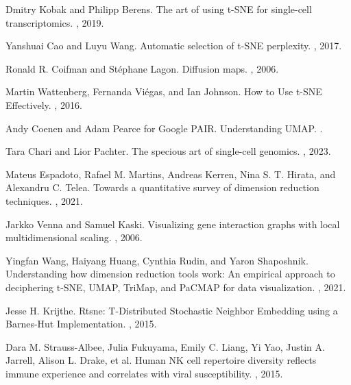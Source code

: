 \documentclass{article}
\begin{document}
\begin{thebibliography}{10}
Dmitry Kobak and Philipp Berens.
\newblock The art of using t-SNE for single-cell transcriptomics.
, 2019.

Yanshuai Cao and Luyu Wang. 
\newblock Automatic selection of t-SNE perplexity.
, 2017.

Ronald R. Coifman and St\'ephane Lagon.
\newblock Diffusion maps.
, 2006.

Martin Wattenberg, Fernanda Vi\'egas, and Ian Johnson.
\newblock How to Use t-SNE Effectively.
, 2016.

Andy Coenen and Adam Pearce for Google PAIR.
\newblock Understanding UMAP.
.

Tara Chari and Lior Pachter.
\newblock The specious art of single-cell genomics.
,  2023.

Mateus Espadoto, Rafael M. Martins, Andreas Kerren, Nina S. T. Hirata, and Alexandru C. Telea.
\newblock Towards a quantitative survey of dimension reduction techniques.
, 2021.

Jarkko Venna and Samuel Kaski.
\newblock Visualizing gene interaction graphs with local multidimensional scaling.
, 2006.

Yingfan Wang, Haiyang Huang, Cynthia Rudin, and Yaron Shaposhnik.
\newblock Understanding how dimension reduction tools work: An empirical approach to deciphering t-SNE, UMAP, TriMap, and PaCMAP for data visualization.
, 2021.

Jesse H. Krijthe.
\newblock Rtsne: T-Distributed Stochastic Neighbor Embedding using a Barnes-Hut Implementation.
, 2015.

Dara M. Strauss-Albee, Julia Fukuyama, Emily C. Liang, Yi Yao, Justin A. Jarrell, Alison L. Drake, et al.
\newblock Human NK cell repertoire diversity reflects immune experience and correlates with viral susceptibility.
, 2015.


\end{thebibliography}
\end{document}
